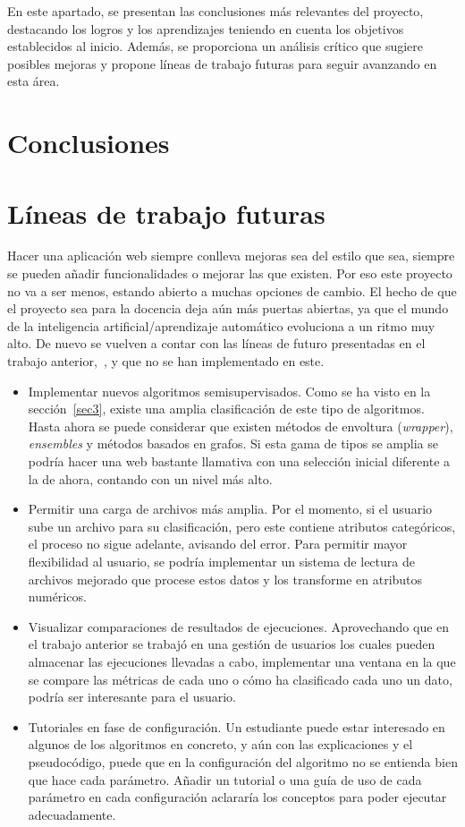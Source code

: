
En este apartado, se presentan las conclusiones más relevantes del proyecto, destacando los logros y los aprendizajes teniendo en cuenta los objetivos establecidos al inicio. Además, se proporciona un análisis crítico que sugiere posibles mejoras y propone líneas de trabajo futuras para seguir avanzando en esta área.

\section{Conclusiones}

\section{Líneas de trabajo futuras}
Hacer una aplicación web siempre conlleva mejoras sea del estilo que sea, siempre se pueden añadir funcionalidades o mejorar las que existen. Por eso este proyecto no va a ser menos, estando abierto a muchas opciones de cambio. El hecho de que el proyecto sea para la docencia deja aún más puertas abiertas, ya que el mundo de la inteligencia artificial/aprendizaje automático evoluciona a un ritmo muy alto. De nuevo se vuelven a contar con las líneas de futuro presentadas en el trabajo anterior,~\cite{TFG:David}, y que no se han implementado en este.

\begin{itemize}
	\item Implementar nuevos algoritmos semisupervisados. Como se ha visto en la sección~\ref{sec3}, existe una amplia clasificación de este tipo de algoritmos. Hasta ahora se puede considerar que existen métodos de envoltura (\textit{wrapper}), \textit{ensembles} y métodos basados en grafos. Si esta gama de tipos se amplia se podría hacer una web bastante llamativa con una selección inicial diferente a la de ahora, contando con un nivel más alto.
	\item Permitir una carga de archivos más amplia. Por el momento, si el usuario sube un archivo para su clasificación, pero este contiene atributos categóricos, el proceso no sigue adelante, avisando del error. Para permitir mayor flexibilidad al usuario, se podría implementar un sistema de lectura de archivos mejorado que procese estos datos y los transforme en atributos numéricos.
	\item Visualizar comparaciones de resultados de ejecuciones. Aprovechando que en el trabajo anterior se trabajó en una gestión de usuarios los cuales pueden almacenar las ejecuciones llevadas a cabo, implementar una ventana en la que se compare las métricas de cada uno o cómo ha clasificado cada uno un dato, podría ser interesante para el usuario.
	\item Tutoriales en fase de configuración. Un estudiante puede estar interesado en algunos de los algoritmos en concreto, y aún con las explicaciones y el pseudocódigo, puede que en la configuración del algoritmo no se entienda bien que hace cada parámetro. Añadir un tutorial o una guía de uso de cada parámetro en cada configuración aclararía los conceptos para poder ejecutar adecuadamente.
	
\end{itemize}